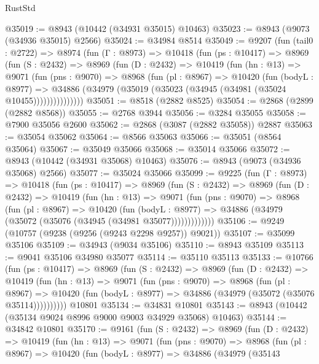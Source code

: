 \begin{lexlean}{RustStd}
\begin{coremodule}
@35019 := @8943 (@10442 (@34931 @35015) @10463)
@35023 := @8943 (@9073 (@34936 @35015) @2566)
@35024 := @34984 @8514
@35049 := @9207
    (fun (tail0 : @2722) =>
    @8974
      (fun (Γ : @8973) =>
      @10418
        (fun (ps : @10417) =>
        @8969
          (fun (S : @2432) =>
          @8969
            (fun (D : @2432) =>
            @10419
              (fun (hn : @13) =>
              @9071
                (fun (pns : @9070) =>
                @8968
                  (fun (pl : @8967) =>
                  @10420
                    (fun (bodyL : @8977) =>
                    @34886 (@34979 (@35019 (@35023 (@34945 (@34981 (@35024 @10455)))))))))))))))
@35051 := @8518 (@2882 @8525)
@35054 := @2868 (@2899 (@2882 @8568))
@35055 := @2768 @3944
@35056 := @3284 @35055
@35058 := @7900 @35056 @2600
@35062 := @2868 (@3087 (@2882 @35058)) @2887
@35063 := @35054 @35062
@35064 := @8566 @35063
@35066 := @35051 (@8564 @35064)
@35067 := @35049 @35066
@35068 := @35014 @35066
@35072 := @8943 (@10442 (@34931 @35068) @10463)
@35076 := @8943 (@9073 (@34936 @35068) @2566)
@35077 := @35024 @35066
@35099 := @9225
    (fun (Γ : @8973) =>
    @10418
      (fun (ps : @10417) =>
      @8969
        (fun (S : @2432) =>
        @8969
          (fun (D : @2432) =>
          @10419
            (fun (hn : @13) =>
            @9071
              (fun (pns : @9070) =>
              @8968
                (fun (pl : @8967) =>
                @10420
                  (fun (bodyL : @8977) =>
                  @34886 (@34979 (@35072 (@35076 (@34945 (@34981 @35077)))))))))))))
@35106 := @9249 (@10757 (@9238 (@9256 (@9243 @2298 @9257)) @9021))
@35107 := @35099 @35106
@35109 := @34943 (@9034 @35106)
@35110 := @8943 @35109
@35113 := @9041 @35106 @34980 @35077
@35114 := @35110 @35113
@35133 := @10766
    (fun (ps : @10417) =>
    @8969
      (fun (S : @2432) =>
      @8969
        (fun (D : @2432) =>
        @10419
          (fun (hn : @13) =>
          @9071
            (fun (pns : @9070) =>
            @8968
              (fun (pl : @8967) =>
              @10420 (fun (bodyL : @8977) => @34886 (@34979 (@35072 (@35076 @35114))))))))))
    @10801
@35134 := @34831 @10801
@35143 := @8943 (@10442 (@35134 @9024 @8996 @9000 @9003 @34929 @35068) @10463)
@35144 := @34842 @10801
@35170 := @9161
    (fun (S : @2432) =>
    @8969
      (fun (D : @2432) =>
      @10419
        (fun (hn : @13) =>
        @9071
          (fun (pns : @9070) =>
          @8968
            (fun (pl : @8967) =>
            @10420
              (fun (bodyL : @8977) =>
              @34886
                (@34979
                  (@35143

\end{coremodule}
\end{lexlean}

